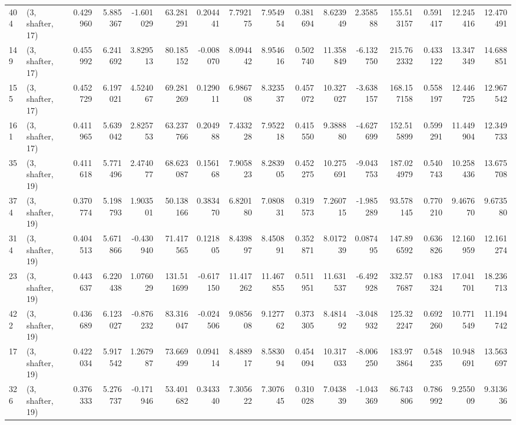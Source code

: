 \begin{tabular}{llrrrrrrrrrrrrrr}
404 &  (3, shafter, 17) &   0.429960 &   5.885367 &  -1.601029 &    63.281291 &   0.204441 &   7.792175 &   7.954954 &  0.381694 &   8.623949 &   2.358588 &   155.513157 &  0.591417 &  12.245416 &  12.470491 \\
149 &  (3, shafter, 17) &   0.455992 &   6.241692 &   3.829513 &    80.185152 &  -0.008070 &   8.094442 &   8.954616 &  0.502740 &  11.358849 &  -6.132750 &   215.762332 &  0.433122 &  13.347349 &  14.688851 \\
155 &  (3, shafter, 17) &   0.452729 &   6.197021 &   4.524067 &    69.281269 &   0.129011 &   6.986708 &   8.323537 &  0.457072 &  10.327027 &  -3.638157 &   168.157158 &  0.558197 &  12.446725 &  12.967542 \\
161 &  (3, shafter, 17) &   0.411965 &   5.639042 &   2.825753 &    63.237766 &   0.204988 &   7.433228 &   7.952218 &  0.415550 &   9.388880 &  -4.627699 &   152.515899 &  0.599291 &  11.449904 &  12.349733 \\
35  &  (3, shafter, 19) &   0.411618 &   5.771496 &   2.474077 &    68.623087 &   0.156168 &   7.905823 &   8.283905 &  0.452275 &  10.275691 &  -9.043753 &   187.024979 &  0.540743 &  10.258436 &  13.675708 \\
374 &  (3, shafter, 19) &   0.370774 &   5.198793 &   1.903501 &    50.138166 &   0.383470 &   6.820180 &   7.080831 &  0.319573 &   7.260715 &  -1.985289 &    93.578145 &  0.770210 &   9.467670 &   9.673580 \\
314 &  (3, shafter, 19) &   0.404513 &   5.671866 &  -0.430940 &    71.417565 &   0.121805 &   8.439897 &   8.450891 &  0.352871 &   8.017239 &   0.087495 &   147.896592 &  0.636826 &  12.160959 &  12.161274 \\
23  &  (3, shafter, 19) &   0.443637 &   6.220438 &   1.076029 &   131.511699 &  -0.617150 &  11.417262 &  11.467855 &  0.511951 &  11.631537 &  -6.492928 &   332.577687 &  0.183324 &  17.041701 &  18.236713 \\
422 &  (3, shafter, 19) &   0.436689 &   6.123027 &  -0.876232 &    83.316047 &  -0.024506 &   9.085608 &   9.127762 &  0.373305 &   8.481492 &  -3.048932 &   125.322247 &  0.692260 &  10.771549 &  11.194742 \\
17  &  (3, shafter, 19) &   0.422034 &   5.917542 &   1.267987 &    73.669499 &   0.094114 &   8.488917 &   8.583094 &  0.454094 &  10.317033 &  -8.006250 &   183.973864 &  0.548235 &  10.948691 &  13.563697 \\
326 &  (3, shafter, 19) &   0.376333 &   5.276737 &  -0.171946 &    53.401682 &   0.343340 &   7.305622 &   7.307645 &  0.310028 &   7.043839 &  -1.043369 &    86.743806 &  0.786992 &   9.255009 &   9.313636 \\

\end{tabular}

